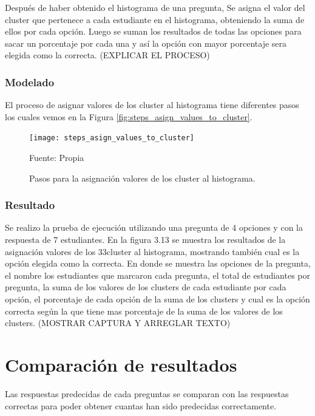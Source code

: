 Después de haber obtenido el histograma de una pregunta, Se asigna el valor del cluster que pertenece a cada estudiante en el histograma, obteniendo la suma de ellos por cada opción. Luego se suman los resultados de todas las opciones para sacar un porcentaje por cada una y así la opción con mayor porcentaje sera elegida como la correcta. (EXPLICAR EL PROCESO)

\subsubsection{Modelado}

El proceso de asignar valores de los cluster al histograma tiene diferentes pasos los cuales vemos en la Figura \ref{fig:steps_asign_values_to_cluster}.

\begin{figure}[ht]
	\begin{center}
		\texttt{[image: steps\_asign\_values\_to\_cluster]}
	\end{center}
	\begin{center}
		\vskip -0.5cm
		\caption{\small{Pasos para la asignación valores de los cluster al histograma.}}
		{\small{Fuente: Propia}}
	\end{center}
\end{figure}

\subsubsection{Resultado}

Se realizo la prueba de ejecución utilizando una pregunta de 4 opciones y con la respuesta de 7 estudiantes. En la figura 3.13 se muestra los resultados de la asignación valores de los 33cluster al histograma, mostrando también cual es la opción elegida como la correcta. En donde se muestra las opciones de la pregunta, el nombre los estudiantes que marcaron cada pregunta,
el total de estudiantes por pregunta, la suma de los valores de los clusters de cada estudiante por cada opción, el porcentaje de cada opción de la suma de los clusters y cual es la opción correcta según la que tiene mas porcentaje de la suma de los valores de los clusters. (MOSTRAR CAPTURA Y ARREGLAR TEXTO)


\section{Comparación de resultados} 

Las respuestas predecidas de cada preguntas se comparan con las respuestas correctas para poder obtener cuantas han sido predecidas correctamente.

